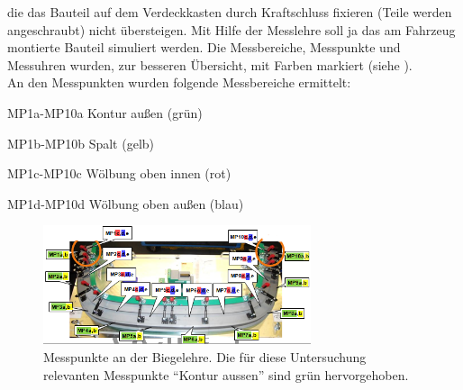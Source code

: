 \documentclass[12pt,a4paper,parskip,twoside,BCOR5mm,headsepline]{scrartcl}
\begin{document}
 
  die das Bauteil auf dem Verdeckkasten durch Kraftschluss fixieren (Teile werden angeschraubt) nicht übersteigen. Mit Hilfe der Messlehre soll ja das am Fahrzeug montierte Bauteil simuliert werden.  Die Messbereiche, Messpunkte und Messuhren wurden, zur besseren Übersicht, mit Farben markiert (siehe ).  \\
 An den Messpunkten wurden folgende Messbereiche ermittelt:
 \begin{description*}
 \item[MP1a-MP10a] Kontur außen (grün)
 \item[MP1b-MP10b] Spalt (gelb)
 \item[MP1c-MP10c] Wölbung oben innen (rot)
 \item[MP1d-MP10d] Wölbung oben außen (blau)
 \end{description*}
\begin{figure}[hbtp]
\centering
\includegraphics[width=0.7\textwidth]{messpunktevdkda3}
\caption{Messpunkte an der Biegelehre. Die für diese Untersuchung relevanten Messpunkte "`Kontur aussen"' sind grün hervorgehoben.}
\label{fig:messpunktevdkda3}
\end{figure} 
 
 
 
\end{document}
